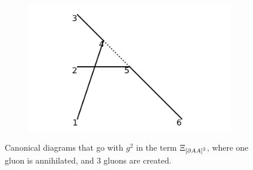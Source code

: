 \documentclass[11pt,a4paper,twoside,pdf]{article}
\numberwithin{equation}{section}
\begin{document}
\begin{figure}[h!]
    \begin{subfigure}[t]{0.33\textwidth}
        \centering
        \includegraphics[width=\textwidth]{plots/canonical/order2/3.png}
        \caption{ }
    \end{subfigure}
    \caption{Canonical diagrams that go with $g^2$ in the term $\Xi_{\left[ \partial AA \right]^2}$, 
    where one gluon is annihilated, and 3 gluons are created.}
    \label{fig:cannonical2_1to3}
\end{figure}
\end{document}
